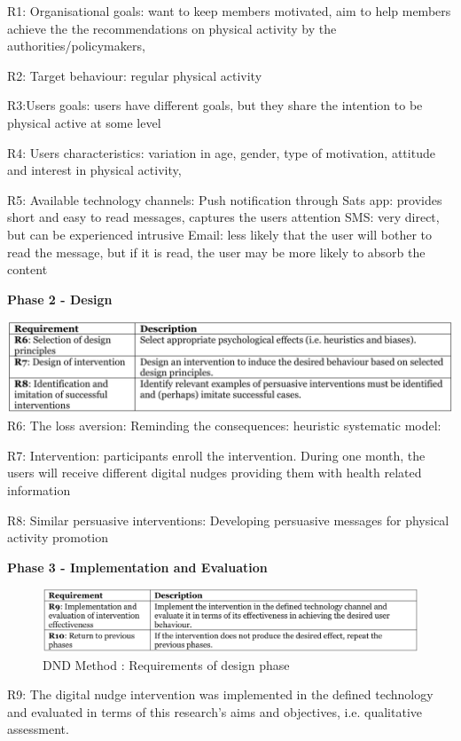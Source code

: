 R1: Organisational goals: want to keep members motivated, aim to help members achieve the the recommendations on physical activity by the authorities/policymakers, 

R2: Target behaviour: regular physical activity 

R3:Users goals: users have different goals, but they share the intention to be physical active at some level 

R4: Users characteristics: variation in age, gender, type of motivation, attitude and interest in physical activity,

R5: Available technology channels: 
Push notification through Sats app: provides short and easy to read messages, captures the users attention
SMS: very direct, but can be experienced intrusive 
Email: less likely that the user will bother to read the message, but if it is read, the user may be more likely to absorb the content

\textbf{Phase 2 - Design }

\includegraphics[width=1\textwidth]{images/Phase2.png}
\bigbreak
R6: The loss aversion: 
Reminding the consequences: 
heuristic systematic model: 

R7: Intervention: participants enroll the intervention. During one month, the users will receive different digital nudges providing them with health related information 

R8: Similar persuasive interventions: Developing persuasive messages for physical activity promotion
 
\textbf{Phase 3 - Implementation and Evaluation }
\bigbreak
\begin{figure}[ht]
\includegraphics[width=1\textwidth]{images/Phase3.png}
\caption{DND Method : Requirements of design phase }
\end{figure}
\bigbreak
\bigbreak

R9: The digital nudge intervention was implemented in the defined technology and evaluated in terms of this research's aims and objectives, i.e. qualitative assessment. 


